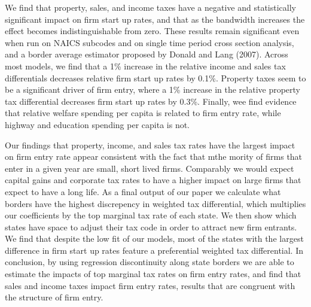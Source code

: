 \documentclass[12 pt, a4paper]{article}
\begin{document}
We find that property, sales, and income taxes have a negative and statistically significant impact on firm start up rates, and that as the bandwidth increases the effect becomes indistinguishable from zero. These results remain significant even when run on NAICS subcodes and on single time period cross section analysis, and a border average estimator proposed by Donald and Lang (2007). Across most models, we find that a 1\% increase in the relative income and sales tax differentials decreases relative firm start up rates by 0.1\%. Property taxes seem to be a significant driver of firm entry, where a 1\% increase in the relative property tax differential decreases firm start up rates by 0.3\%. Finally, wee find evidence that relative welfare spending per capita is related to firm entry rate, while highway and education spending per capita is not.

Our findings that property, income, and sales tax rates have the largest impact on firm entry rate appear consistent with the fact that mthe mority of firms that enter in a given year are small, short lived firms. Comparably we would expect capital gains and corporate tax rates to have a higher impact on large firms that expect to have a long life. As a final output of our paper we calculate what borders have the highest discrepency in weighted tax differential, which multiplies our coefficients by the top marginal tax rate of each state. We then show which states have space to adjust their tax code in order to attract new firm entrants. We find that despite the low fit of our models, most of the states with the largest difference in firm start up rates feature a preferential weighted tax differential. In conclusion, by using regression discontinuity along state borders we are able to estimate the impacts of top marginal tax rates on firm entry rates, and find that sales and income taxes impact firm entry rates, results that are congruent with the structure of firm entry.
\end{document}
